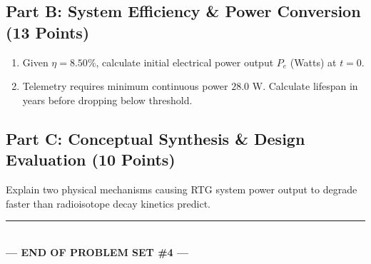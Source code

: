 \documentclass[11pt,a4paper]{article}
\begin{document}
\subsection*{Part B: System Efficiency \& Power Conversion (13 Points)}

\begin{enumerate}[label=\arabic*., leftmargin=1.5em, itemsep=0.08em]
  \item Given $\eta = 8.50\%$, calculate initial electrical power output $P_e$ (Watts) at $t = 0$.
  \item Telemetry requires minimum continuous power $28.0\text{ W}$. Calculate lifespan in years before dropping below threshold.
\end{enumerate}

\begin{tcolorbox}[workspace, height=2.8cm]
\end{tcolorbox}

\subsection*{Part C: Conceptual Synthesis \& Design Evaluation (10 Points)}
Explain two physical mechanisms causing RTG system power output to degrade faster than radioisotope decay kinetics predict.

\begin{tcolorbox}[workspace, height=2.0cm]
\end{tcolorbox}

\vspace{0.05cm}

\begin{center}
  \color{TealAccent}
  \rule{0.5\textwidth}{0.5pt} \\[1pt]
  \scriptsize\textbf{--- END OF PROBLEM SET \#4 ---}
\end{center}
\end{document}
